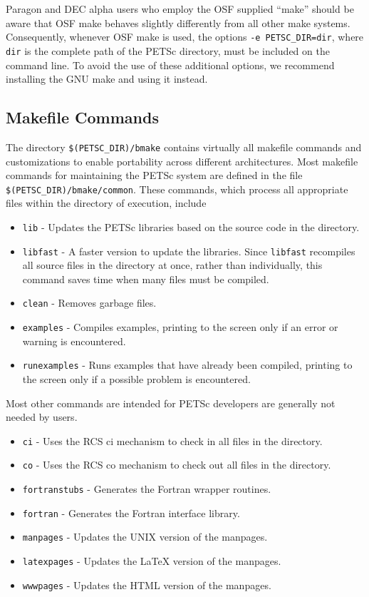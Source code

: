 Paragon and DEC alpha users who employ the OSF supplied ``make'' should
be aware that OSF make behaves slightly differently from all other 
make systems.  Consequently, whenever OSF make is used, the options
{\tt -e PETSC\_DIR=dir}, where {\tt dir} is the complete path of the 
PETSc directory, must be included on the command line.
To avoid the use of these additional options, we recommend
installing the GNU make and using it instead.

\subsection{Makefile Commands} \label{sec:common}

The directory {\tt \$(PETSC\_DIR)/bmake} contains virtually all
makefile commands and customizations to enable portability across
different architectures.  Most makefile commands for maintaining the
PETSc system are defined in the file {\tt \$(PETSC\_DIR)/bmake/common}.  
These commands, which process all appropriate files within the
directory of execution, include
\begin{itemize}
\item {\tt lib} - Updates the PETSc libraries based on the source code
      in the directory.
\item {\tt libfast} - A faster version to update the libraries.  Since
      {\tt libfast} recompiles all source files in the directory at once,
      rather than individually, this command saves time when many files
      must be compiled.
\item {\tt clean} - Removes garbage files.
\item {\tt examples} - Compiles examples, printing to the screen only if 
       an error or warning is encountered.
\item {\tt runexamples} - Runs examples that have already been compiled,
       printing to the screen only if a possible problem is encountered.
\end{itemize}
\noindent Most other commands are intended for PETSc developers are generally
not needed by users.
\begin{itemize}
\item {\tt ci} - Uses the RCS ci mechanism to check in all files in the
      directory. 
\item {\tt co} - Uses the RCS co mechanism to check out 
      all files in the directory. 
\item {\tt fortranstubs} - Generates the Fortran wrapper routines.  
\item {\tt fortran} - Generates the Fortran interface library. 
\item {\tt manpages} - Updates the UNIX version of the manpages.
\item {\tt latexpages} - Updates the LaTeX version of the manpages.
\item {\tt wwwpages} - Updates the HTML version of the manpages.
\end{itemize}

